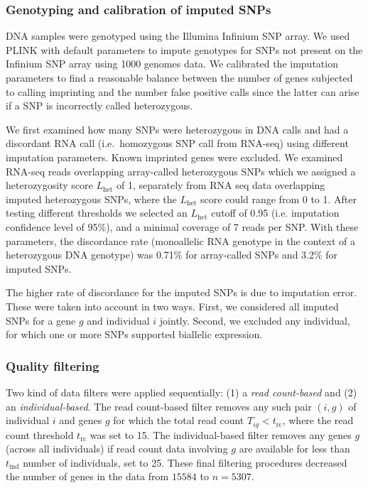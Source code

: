 \documentclass[letterpaper]{article}
\begin{document}
\subsubsection{Genotyping and calibration of imputed SNPs}

DNA samples were genotyped using the Illumina Infinium SNP array. We used
PLINK with default parameters to impute genotypes for SNPs not present on the
Infinium SNP array using 1000 genomes data.  We calibrated the
imputation parameters to find a reasonable balance between the number of genes
subjected to calling imprinting and the number false positive
calls since the latter can arise if a SNP is
incorrectly called heterozygous.

We first examined how many SNPs were heterozygous in DNA calls and had a
discordant RNA call (i.e.~homozygous SNP call from RNA-seq) using different imputation
parameters. Known imprinted genes were excluded. We examined RNA-seq reads
overlapping array-called heterozygous SNPs which we assigned a heterozygosity
score \(L_\mathrm{het}\) of 1, separately from RNA seq data
overlapping imputed heterozygous SNPs, where the \(L_\mathrm{het}\) score could
range from 0 to 1.  After testing different thresholds
we selected an \(L_\mathrm{het}\) cutoff of 0.95 (i.e. imputation confidence
level of 95\%), and a minimal coverage of 7 reads per SNP. With these
parameters, the discordance rate (monoallelic RNA genotype in the context of a
heterozygous DNA genotype) was 0.71\% for array-called SNPs and 3.2\% for
imputed SNPs.

The higher rate of discordance for the imputed SNPs
is due to imputation error.  These were taken into
account in two ways.
First, we considered all imputed SNPs for a gene \(g\) and individual \(i\)
jointly.  Second, we excluded
any individual, for which one or more SNPs supported biallelic
expression.


\subsubsection{Quality filtering}

\label{sec:filtering}

Two kind of data filters were applied sequentially: (1) a \emph{read
count-based} and (2) an \emph{individual-based}.  The read count-based filter
removes any such pair $(i,g)$ of individual $i$ and genes $g$ for which the
total read count $T_{ig}<t_\mathrm{rc}$, where the read count threshold
$t_\mathrm{rc}$ was set to 15. The individual-based filter removes any genes
$g$ (across all individuals) if read count data involving $g$ are available
for less than $t_\mathrm{ind}$ number of individuals, set to 25.
These final filtering procedures decreased the number of genes in the data from
\(15584\) to \(n=5307\).
\end{document}
